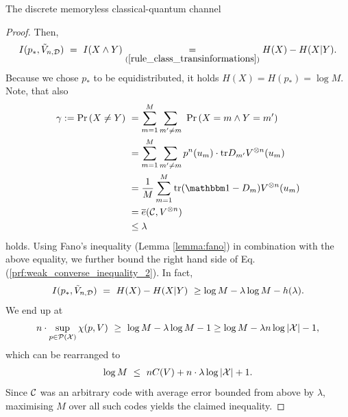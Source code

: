 \begin{section}{The discrete memoryless  classical-quantum channel}
\begin{proof}
      Then, 
      \begin{align}
       I(p_{\ast}, \tilde{V}_{n,\cD}) \ 
       = \ I(X\wedge Y) \nonumber
        \underset{(\ref{rule_class_transinformations})}{=} H(X) - H(X|Y).
      \end{align}
      Because we chose $p_{\ast}$ to be equidistributed, it holds
      $
       H(X) = H(p_{\ast}) = \log M.
      $
       Note, that also 
      \begin{align}
       \gamma := \prob \left(X \neq Y\right) \
       &= \sum_{m=1}^M \sum_{m' \neq m} \ \prob \left(X = m \wedge Y = m' \right) \nonumber \\
       &= \sum_{m=1}^M \sum_{m' \neq m} p^n(u_m) \cdot \tr D_{m'}V^{\otimes n}(u_m) \nonumber \\
       &= \frac{1}{M} \sum_{m=1}^M \tr(\bbmeins - D_{m})V^{\otimes n}(u_m) \nonumber \\
       &= \overline{e}(\cC, V^{\otimes n}) \label{prf:weak_converse_inequality_} \nonumber \\
       &\leq \lambda
      \end{align}
      holds. Using Fano's inequality (Lemma \ref{lemma:fano}) in combination with the above equality, we further bound the right hand side of Eq. (\ref{prf:weak_converse_inequality_2}). In fact, 
      \begin{align*}
       I(p_{\ast}, \tilde{V}_{n,\cD}) \ 
       = \ H(X) - H(X|Y) \
       \geq \log M - \lambda \log M - h(\lambda).
      \end{align*}
      We end up at
      \begin{align*}
       n \cdot \sup_{p \in {\mathcal P}({\mathcal X})} \chi(p,V) \ \geq \ \log M - \lambda \log M - 1 \geq \log M - \lambda n \log |{\mathcal X}| - 1,
      \end{align*}
      which can be rearranged to 
      \begin{align*}
       \log M \ \leq \ n C(V) + n \cdot \lambda \log |{\mathcal X}| + 1.
      \end{align*}
      Since ${\mathcal C}$ was an arbitrary code with average error bounded from above by $\lambda$, maximising $M$ over all such codes yields the claimed inequality. 
      \end{proof}

\end{section}
